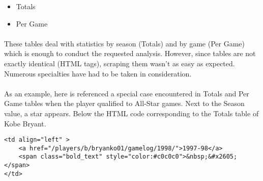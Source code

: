 \begin{itemize}
	\item Totals
	\item Per Game
\end{itemize}

\paragraph{}These tables deal with statistics by season (Totals) and by game (Per Game) which is enough to conduct the requested analysis. However, since tables are not exactly identical (HTML tags), scraping them wasn't as easy as expected. Numerous specialties have had to be taken in consideration.

\paragraph{}As an example, here is referenced a special case encountered in Totals and Per Game tables when the player qualified to All-Star games. Next to the Season value, a star appears. Below the HTML code corresponding to the Totals table of Kobe Bryant.

\begin{verbatim}
<td align="left" >
	<a href="/players/b/bryanko01/gamelog/1998/">1997-98</a>
	<span class="bold_text" style="color:#c0c0c0">&nbsp;&#x2605;</span>
</td>
\end{verbatim}

